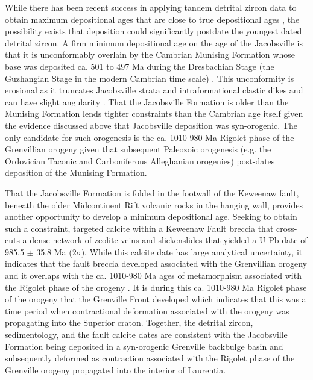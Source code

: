 While there has been recent success in applying tandem detrital zircon data to obtain maximum depositional ages that are close to true depositional ages \citep{Karlstrom2020a}, the possibility exists that deposition could significantly postdate the youngest dated detrital zircon. A firm minimum depositional age on the age of the Jacobsville is that it is unconformably overlain by the Cambrian Munising Formation whose base was deposited ca. 501 to 497 Ma during the Dresbachian Stage (the Guzhangian Stage in the modern Cambrian time scale) \citep{Hamblin1958a, Haddox1990a}. This unconformity is erosional as it truncates Jacobsville strata and intraformational clastic dikes and can have slight angularity \citep{Hamblin1958a, Haddox1990a}. That the Jacobsville Formation is older than the Munising Formation lends tighter constraints than the Cambrian age itself given the evidence discussed above that Jacobsville deposition was syn-orogenic. The only candidate for such orogenesis is the ca. 1010-980 Ma Rigolet phase of the Grenvillian orogeny given that subsequent Paleozoic orogenesis (e.g. the Ordovician Taconic and Carboniferous Alleghanian orogenies) post-dates deposition of the Munising Formation.

That the Jacobsville Formation is folded in the footwall of the Keweenaw fault, beneath the older Midcontinent Rift volcanic rocks in the hanging wall, provides another opportunity to develop a minimum depositional age. Seeking to obtain such a constraint, \cite{Hodgin2022a} targeted calcite within a Keweenaw Fault breccia that cross-cuts a dense network of zeolite veins and slickenslides that yielded a U-Pb date of 985.5 $\pm$ 35.8 Ma (2$\sigma$). While this calcite date has large analytical uncertainty, it indicates that the fault breccia developed associated with the Grenvillian orogeny and it overlaps with the ca. 1010-980 Ma ages of metamorphism associated with the Rigolet phase of the orogeny \citep{Swanson-Hysell2023a}. It is during this ca. 1010-980 Ma Rigolet phase of the orogeny that the Grenville Front developed \citep{Rivers2008a} which indicates that this was a time period when contractional deformation associated with the orogeny was propagating into the Superior craton. Together, the detrital zircon, sedimentology, and the fault calcite dates are consistent with the Jacobsville Formation being deposited in a syn-orogenic Grenville backbulge basin and subsequently deformed as contraction associated with the Rigolet phase of the Grenville orogeny propagated into the interior of Laurentia. 

